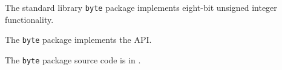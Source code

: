 
The standard library {\tt byte} package implements eight-bit unsigned integer functionality.

The {\tt byte} package implements the  API.

The {\tt byte} package source code is in .



